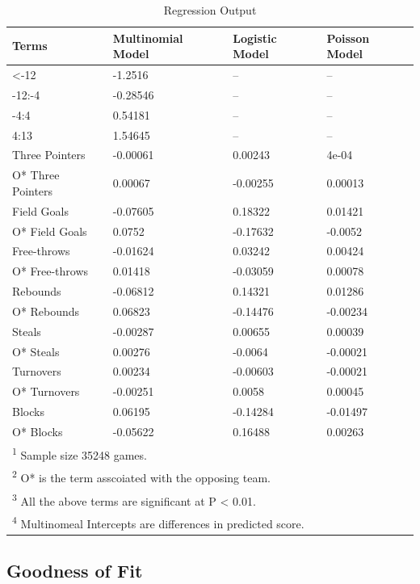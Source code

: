 \documentclass[
  english,
  man,floatsintext]{apa6}
\begin{document}
\begin{longtable}[t]{llll}
\caption{\label{tab:unnamed-chunk-5}Regression Output}\\
\toprule
Terms & Multinomial Model & Logistic Model & Poisson Model\\
\midrule
<-12 & -1.2516 & -- & --\\
-12:-4 & -0.28546 & -- & --\\
-4:4 & 0.54181 & -- & --\\
4:13 & 1.54645 & -- & --\\
Three Pointers & -0.00061 & 0.00243 & 4e-04\\
\addlinespace
O* Three Pointers & 0.00067 & -0.00255 & 0.00013\\
Field Goals & -0.07605 & 0.18322 & 0.01421\\
O* Field Goals & 0.0752 & -0.17632 & -0.0052\\
Free-throws & -0.01624 & 0.03242 & 0.00424\\
O* Free-throws & 0.01418 & -0.03059 & 0.00078\\
\addlinespace
Rebounds & -0.06812 & 0.14321 & 0.01286\\
O* Rebounds & 0.06823 & -0.14476 & -0.00234\\
Steals & -0.00287 & 0.00655 & 0.00039\\
O* Steals & 0.00276 & -0.0064 & -0.00021\\
Turnovers & 0.00234 & -0.00603 & -0.00021\\
\addlinespace
O* Turnovers & -0.00251 & 0.0058 & 0.00045\\
Blocks & 0.06195 & -0.14284 & -0.01497\\
O* Blocks & -0.05622 & 0.16488 & 0.00263\\
\bottomrule
\multicolumn{4}{l}{\rule{0pt}{1em}\textsuperscript{1} Sample size 35248 games.}\\
\multicolumn{4}{l}{\rule{0pt}{1em}\textsuperscript{2} O* is the term asscoiated with the opposing team.}\\
\multicolumn{4}{l}{\rule{0pt}{1em}\textsuperscript{3} All the above terms are significant at P < 0.01.}\\
\multicolumn{4}{l}{\rule{0pt}{1em}\textsuperscript{4} Multinomeal Intercepts are differences in predicted score.}\\
\end{longtable}

\hypertarget{goodness-of-fit}{%
\subsection{Goodness of Fit}\label{goodness-of-fit}}
\end{document}
